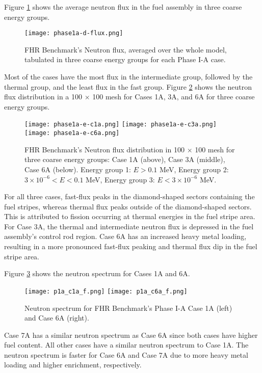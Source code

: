 Figure \ref{fig:phase1a-d} shows the average neutron flux in the fuel assembly in 
three coarse energy groups. 
\begin{figure}[]
    \centering
    \texttt{[image: phase1a-d-flux.png]} 
    \caption{\acrlong{FHR} Benchmark's Neutron flux, averaged over the whole 
    model, tabulated in three coarse energy groups for each Phase I-A case. }
    \label{fig:phase1a-d}
\end{figure}
Most of the cases have the most flux in the intermediate group, followed by 
the thermal group, and the least flux in the fast group.    
Figure \ref{fig:phase1a-e} shows the neutron flux distribution in a 100 $\times$ 
100 mesh for Cases 1A, 3A, and 6A for three coarse energy groups. 
\begin{figure}[]
    \centering
    \texttt{[image: phase1a-e-c1a.png]} 
    \texttt{[image: phase1a-e-c3a.png]} 
    \texttt{[image: phase1a-e-c6a.png]} 
    \caption{\acrlong{FHR} Benchmark's Neutron flux distribution in 100 
    $\times$ 100 mesh for three coarse energy groups: Case 1A (above), Case 3A 
    (middle), Case 6A (below). Energy group 1: $E > 0.1$ MeV, Energy group 2: 
    $3 \times 10^{-6} < E < 0.1$ MeV, Energy group 3: $E < 3 \times 10^{-6}$ MeV. }
    \label{fig:phase1a-e}
\end{figure}
For all three cases, fast-flux peaks in the diamond-shaped sectors containing 
the fuel stripes, whereas thermal flux peaks outside of the diamond-shaped 
sectors. 
This is attributed to fission occurring at thermal energies in the 
fuel stripe area. 
For Case 3A, the thermal and intermediate neutron flux is depressed in the fuel 
assembly's control rod region.  
Case 6A has an increased heavy metal loading, resulting in a more pronounced 
fast-flux peaking and thermal flux dip in the fuel stripe area. 

Figure \ref{fig:phase1a-f} shows the neutron spectrum for Cases 1A and 6A. 
\begin{figure}[]
    \centering
    \texttt{[image: p1a\_c1a\_f.png]} 
    \texttt{[image: p1a\_c6a\_f.png]} 
    \caption{Neutron spectrum for \acrlong{FHR} Benchmark's Phase I-A Case 1A 
    (left) and Case 6A (right).}
    \label{fig:phase1a-f}
\end{figure}
Case 7A has a similar neutron spectrum as Case 6A since both cases have 
higher fuel content. 
All other cases have a similar neutron spectrum to Case 1A.
The neutron spectrum is faster for Case 6A and Case 7A due to more heavy metal 
loading and higher enrichment, respectively.  

